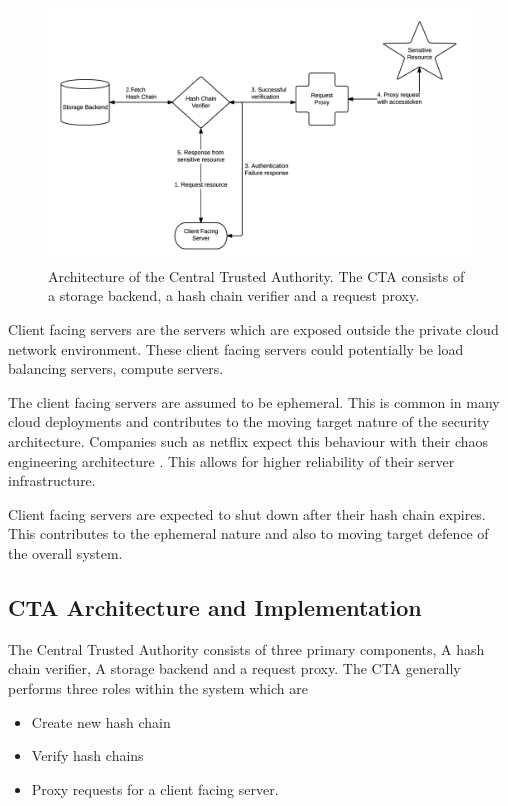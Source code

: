 \documentclass[12pt,conference]{IEEEtran}
\begin{document}
\begin{figure}[!ht]
  \centering
  \includegraphics[keepaspectratio=true,scale=0.8]{cta_architecture}
  \caption{Architecture of the Central Trusted Authority. The CTA consists of a storage backend, a hash chain verifier and a request proxy.}
  \label{fig:ctaarchitecture}
\end{figure}


Client facing servers are the servers which are exposed outside the private cloud network environment. These client facing servers could potentially be load balancing servers, compute servers.

The client facing servers are assumed to be ephemeral. This is common in many cloud deployments \cite{vaquero_dynamically_2011} and contributes to the moving target nature of the security architecture. Companies such as netflix expect this behaviour with their chaos engineering architecture \cite{basiri_chaos_2016}. This allows for higher reliability of their server infrastructure.

Client facing servers are expected to shut down after their hash chain expires. This contributes to the ephemeral nature and also to moving target defence of the overall system.

\subsection*{CTA Architecture and Implementation}

The Central Trusted Authority consists of three primary components, A hash chain verifier, A storage backend and a request proxy. The CTA generally performs three roles within the system which are

\begin{itemize}
\item Create new hash chain
\item Verify hash chains
\item Proxy requests for a client facing server.
\end{itemize}
\end{document}
